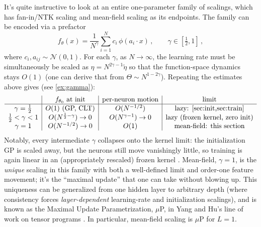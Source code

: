 \documentclass[11pt]{article}
\newcommand{\CN}{{\mathcal N}}
\begin{document}
It's quite instructive to look at an entire one-parameter family of scalings, which has fan-in/NTK scaling and mean-field scaling as its endpoints. The family can be encoded via a prefactor
%
\begin{equation} \label{gamma-f}
    f_\theta(x) = \frac{1}{N^{\gamma}} \sum_{i=1}^N c_i\,\phi(a_i\cdot x)\,,\qquad \gamma\in[\tfrac{1}{2},1]\,,
\end{equation}
%
where $c_i, a_{ij}\sim \CN(0,1)$. For each $\gamma$, as $N\to\infty$, the learning rate must be simultaneously be scaled as $\eta = N^{2\gamma-1}\tilde\eta$ so that the function-space dynamics stays $O(1)$ (one can derive that from $\Theta\sim N^{1-2\gamma}$). Repeating the estimates above gives (see \cref{ex:gamma}):
%
\begin{equation}
\begin{array}{c|c|c|c}
    & f_{\theta_0} \text{ at init} & \text{per-neuron motion} & \text{limit} \\\hline
    \gamma=\tfrac{1}{2} & O(1) \text{ (GP, CLT)} & O(N^{-1/2}) & \text{lazy: \cref{sec:init,sec:train}} \\
    \tfrac{1}{2}<\gamma<1 & O(N^{\frac{1}{2}-\gamma})\to 0 & O(N^{\gamma-1})\to 0 & \text{lazy (frozen kernel, zero init)} \\
    \gamma=1 & O(N^{-1/2})\to 0 & O(1) & \text{mean-field: this section}
\end{array}
\end{equation}
%
Notably, every intermediate $\gamma$ collapses onto the kernel limit: the initialization GP is scaled away, but the neurons still move vanishingly little, so training is again linear in an (appropriately rescaled) frozen kernel \cite{chizat2019lazy,mei2018mean}. Mean-field, $\gamma=1$, is the \emph{unique} scaling in this family with both a well-defined limit and order-one feature movement; it's the ``maximal update'' that one can take without blowing up. This uniqueness can be generalized from one hidden layer to arbitrary depth (where consistency forces \emph{layer-dependent} learning-rate and initialization scalings), and is known as the Maximal Update Parametrization, $\mu$P, in Yang and Hu's line of work on tensor programs \cite{yang2021tensor}. In particular, mean-field scaling is $\mu$P for $L=1$.
\end{document}
